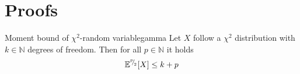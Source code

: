 \documentclass[12pt]{article}
\begin{document}

\clearpage
%
\printbibliography

\appendix

\clearpage
\section{Proofs}

\begin{lemma}{Moment bound of $\chi^2$-random variable}{gamma}
    Let $X$ follow a $\chi^2$ distribution with $k \in \mathbb{N}$ degrees of freedom. Then for all $p \in \mathbb{N}$ it holds
    \begin{equation}
        \mathbb{E}^{{}^{p}{\mskip -5mu/\mskip -3mu}_{2}}[X] \leq k + p
    \end{equation}
\end{lemma}
\end{document}
